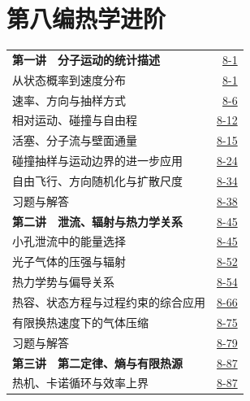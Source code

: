 \section*{第八编\quad 热学进阶}
\begin{longtable}{@{}p{}r@{}}
\textbf{第一讲　分子运动的统计描述}&\href{course-page:8:4}{8-1}\\[2pt]
\hspace{1em}从状态概率到速度分布&\href{course-page:8:4}{8-1}\\[2pt]
\hspace{1em}速率、方向与抽样方式&\href{course-page:8:9}{8-6}\\[2pt]
\hspace{1em}相对运动、碰撞与自由程&\href{course-page:8:15}{8-12}\\[2pt]
\hspace{1em}活塞、分子流与壁面通量&\href{course-page:8:18}{8-15}\\[2pt]
\hspace{1em}碰撞抽样与运动边界的进一步应用&\href{course-page:8:27}{8-24}\\[2pt]
\hspace{1em}自由飞行、方向随机化与扩散尺度&\href{course-page:8:37}{8-34}\\[2pt]
\hspace{1em}习题与解答&\href{course-page:8:41}{8-38}\\[2pt]
\textbf{第二讲　泄流、辐射与热力学关系}&\href{course-page:8:48}{8-45}\\[2pt]
\hspace{1em}小孔泄流中的能量选择&\href{course-page:8:48}{8-45}\\[2pt]
\hspace{1em}光子气体的压强与辐射&\href{course-page:8:55}{8-52}\\[2pt]
\hspace{1em}热力学势与偏导关系&\href{course-page:8:57}{8-54}\\[2pt]
\hspace{1em}热容、状态方程与过程约束的综合应用&\href{course-page:8:69}{8-66}\\[2pt]
\hspace{1em}有限换热速度下的气体压缩&\href{course-page:8:78}{8-75}\\[2pt]
\hspace{1em}习题与解答&\href{course-page:8:82}{8-79}\\[2pt]
\textbf{第三讲　第二定律、熵与有限热源}&\href{course-page:8:90}{8-87}\\[2pt]
\hspace{1em}热机、卡诺循环与效率上界&\href{course-page:8:90}{8-87}\\[2pt]

\end{longtable}
